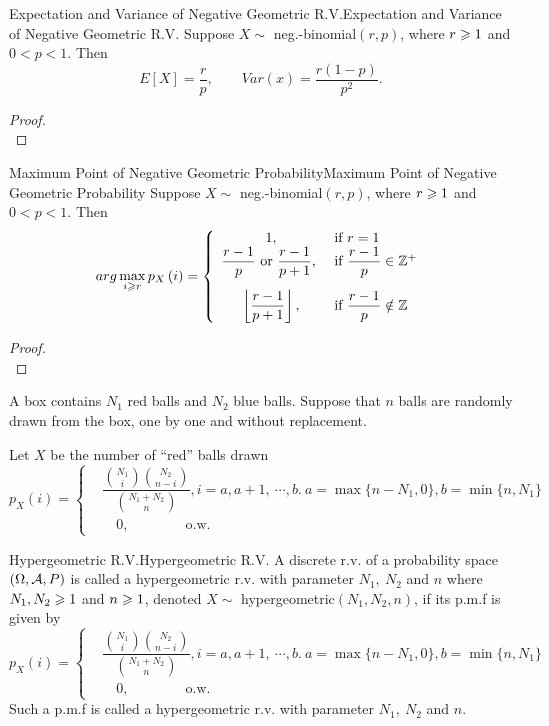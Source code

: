 \documentclass{elegantbook}
\begin{document}
\begin{theorem}{Expectation and Variance of Negative Geometric R.V.}{Expectation and Variance of Negative Geometric R.V.}
Suppose $X\sim$ neg.-binomial$(r,p)$, where $r\geqslant1$ and $0<p<1$. Then
$$
E\left[X\right]=\frac{r}{p},\qquad
Var(x)=\frac{r(1-p)}{p^2}.
$$
\end{theorem}

\begin{proof}
\\[4cm]\vspace{0.01cm}
\end{proof}

\begin{theorem}{Maximum Point of Negative Geometric Probability}{Maximum Point of Negative Geometric Probability}
Suppose $X\sim$ neg.-binomial$(r,p)$, where $r\geqslant1$ and $0<p<1$. Then
$$
arg\max\limits_{i\gs r}p_X\left(i\right)=
\left\{\begin{array}{cl}                
1,                             &\text{if } r=1\\
\dfrac{r-1}{p}\ \text{or } \dfrac{r-1}{p+1},\  &\text{if } \dfrac{r-1}{p}\in\mz^+\vspace{0.3cm}\\
\left\lfloor\dfrac{r-1}{p+1}\right\rfloor,               &\text{if } \dfrac{r-1}{p}\notin\mz     
\end{array}
\right.
$$
\end{theorem}

\begin{proof}
\\[4cm]\vspace{0.01cm}
\end{proof}

A box contains $N_1$ red balls and $N_2$ blue balls. Suppose that $n$ balls are randomly drawn from the box, one by one and without replacement.

Let $X$ be the number of ``red'' balls drawn
$$
p_X\left(i\right)=
\left\{\begin{aligned}
&\dfrac{\binom {N_1} i \binom {N_2} {n-i}}{\binom {N_1+N_2} n},i=a,a+1,\ \cdots, b. \ a=\max\{n-N_1,0\},b=\min\{n,N_1\}     \\
&\quad0, \qquad\qquad\text{o.w.}              
\end{aligned}\right.                                                    
$$

\begin{definition}{Hypergeometric R.V.}{Hypergeometric R.V.}
A discrete r.v. of a probability space $(\Omega,\mathcal{A}, P)$ is called a hypergeometric r.v. with parameter $N_1,\ N_2$ and $n$ where $N_1,N_2\geqslant1$ and $n\geqslant1$, denoted $X\sim$ hypergeometric$(N_1,N_2,n)$, if its p.m.f is given by
$$
p_X\left(i\right)=
\left\{\begin{aligned}
&\dfrac{\binom {N_1} i \binom {N_2} {n-i}}{\binom {N_1+N_2} n},i=a,a+1,\ \cdots, b. \ a=\max\{n-N_1,0\},b=\min\{n,N_1\}     \\
&\quad0, \qquad\qquad\text{o.w.}              
\end{aligned}\right.                                                    
$$
Such a p.m.f is called a hypergeometric r.v. with parameter $N_1,\ N_2$ and $n$.
\end{definition}
\end{document}
